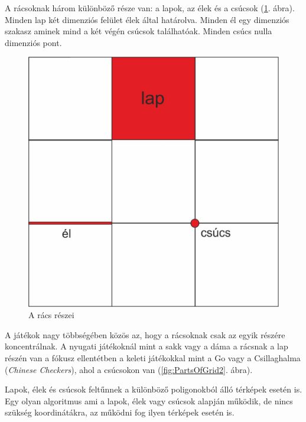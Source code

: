 A rácsoknak három különböző része van: a lapok, az élek és a csúcsok (\ref{fig:PartsOfGrid}. ábra). Minden lap két dimenziós felület élek által határolva. Minden él egy dimenziós szakasz aminek mind a két végén csúcsok találhatóak. Minden csúcs nulla dimenziós pont. 

\begin{figure}[h!]
\centering
\includegraphics[scale=0.4]{kepek/PartsOfGrid.jpg}
\caption{A rács részei}
\label{fig:PartsOfGrid}
\end{figure}

A játékok nagy többségében közös az, hogy a rácsoknak csak az egyik részére koncentrálnak. A nyugati játékoknál mint a sakk vagy a dáma a rácsnak a lap részén van a fókusz ellentétben a keleti játékokkal mint a Go vagy a Csillaghalma (\textit{Chinese Checkers}), ahol a csúcsokon van (\ref{fig:PartsOfGrid2}. ábra).

Lapok, élek és csúcsok feltűnnek a különböző poligonokból álló térképek esetén is. Egy olyan algoritmus ami a lapok, élek vagy csúcsok alapján működik, de nincs szükség koordinátákra, az működni fog ilyen térképek esetén is.

